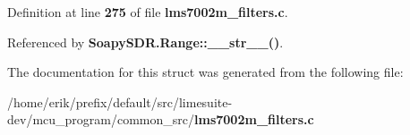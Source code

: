 Definition at line {\bf 275} of file {\bf lms7002m\+\_\+filters.\+c}.



Referenced by {\bf Soapy\+S\+D\+R.\+Range\+::\+\_\+\+\_\+str\+\_\+\+\_\+()}.



The documentation for this struct was generated from the following file\+:\begin{DoxyCompactItemize}
\item 
/home/erik/prefix/default/src/limesuite-\/dev/mcu\+\_\+program/common\+\_\+src/{\bf lms7002m\+\_\+filters.\+c}\end{DoxyCompactItemize}
